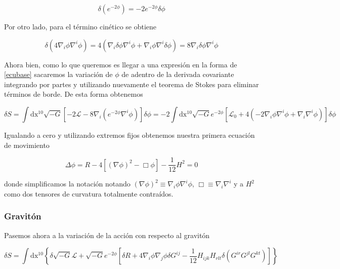 \documentclass{article}
\numberwithin{equation}{section}
\begin{document}
\begin{equation*}
\delta \left(e^{-2\phi}\right) = -2 e^{-2\phi} \delta \phi 
\end{equation*}

Por otro lado, para el término cinético se obtiene

\begin{equation*}
\delta \left( 4 \nabla_{i}\phi\nabla^{i} \phi \right) = 4 \left( \nabla_{i} \delta \phi \nabla^{i} \phi + \nabla_{i} \phi \nabla^{i} \delta \phi \right) = 8 \nabla_{i} \delta \phi \nabla^{i} \phi
\end{equation*}

Ahora bien, como lo que queremos es llegar a una expresión en la forma de \ref{ecubase} sacaremos la variación de $ \phi $ de adentro de la derivada covariante integrando por partes y utilizando nuevamente el teorema de Stokes para eliminar términos de borde. De esta forma obtenemos

\begin{equation*}
\delta S = \int\mathrm{dx^{10}}\sqrt{-G} \left[-2 \mathscr{L}  - 8 \nabla_{i} \left( e^{-2\phi} \nabla^{i} \phi \right) \right] \delta \phi = 	-2 \int\mathrm{dx^{10}}\sqrt{-G} e^{-2\phi}\left[  \mathscr{L}_0 + 4 \left( -2 \nabla_{i}\phi\nabla^{i}\phi + \nabla_{i}\nabla^{i} \phi \right) \right] \delta \phi
\end{equation*} 

Igualando a cero y utilizando extremos fijos obtenemos nuestra primera ecuación de movimiento

\vspace{0.4cm}
\begin{boxquation}	
\begin{equation}\label{eqdil}
\Delta \phi = R - 4 \left[ \left(\nabla \phi\right)^2 - \Box \phi \right] - \frac{1}{12} H^2 = 0
\end{equation}
\end{boxquation}

donde simplificamos la notación notando $ \left(\nabla \phi\right)^2 \equiv \nabla_i \phi \nabla^i \phi $, $ \Box \equiv \nabla_i\nabla^i $ y a $ H^2 $ como dos tensores de curvatura totalmente contraídos.

\subsubsection{Gravitón}

Pasemos ahora a la variación de la acción con respecto al gravitón

\begin{equation}\label{vargra}
\delta S = \int\mathrm{dx^{10}} \left\{ \delta \sqrt{-G} \mathscr{L} + \sqrt{-G} e^{-2\phi} \left[\delta R + 4 \nabla_{i}\phi\nabla_{j}\phi \delta G^{ij} - \frac{1}{12} H_{ijk}  H_{rlt} \delta \left(G^{i r} G^{j l} G^{k t} \right)\right]  \right\}
\end{equation}
\end{document}

